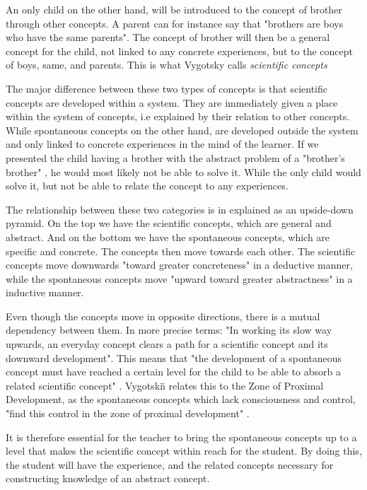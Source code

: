 An only child on the other hand, will be introduced to the concept of brother through other concepts. A parent can for instance say that "brothers are boys who have the same parents". The concept of brother will then be a general concept for the child, not linked to any concrete experiences, but to the concept of boys, same, and parents. This is what Vygotsky calls \emph{scientific concepts}

The major difference between these two types of concepts is that scientific concepts are developed within a system. They are immediately given a place within the system of concepts, i.e explained by their relation to other concepts. While spontaneous concepts on the other hand, are developed outside the system and only linked to concrete experiences in the mind of the learner. If we presented the child having a brother with the abstract problem of a "brother's brother" \citep{vygotsky2012thought}, he would most likely not be able to solve it. While the only child would solve it, but not be able to relate the concept to any experiences.  

The relationship between these two categories is in \citet{vygotsky2012thought} explained as an upside-down pyramid. On the top we have the scientific concepts, which are general and abstract. And on the bottom we have the spontaneous concepts, which are specific and concrete. The concepts then move towards each other. The scientific concepts move downwards "toward greater concreteness" in a deductive manner, while the spontaneous concepts move "upward toward greater abstractness" \citep{vygotsky2012thought} in a inductive manner.

Even though the concepts move in opposite directions, there is a mutual dependency between them. In more precise terms: "In working its slow way upwards, an everyday concept clears a path for a scientific concept and its downward development". This means that "the development of a spontaneous concept must have reached a certain level for the child to be able to absorb a related scientific concept" \citep{vygotsky2012thought}. Vygotski{\u\i} relates this to the Zone of Proximal Development, as the spontaneous concepts which lack consciousness and control, "find this control in the zone of proximal development" \citep{vygotsky2012thought}.

It is therefore essential for the teacher to bring the spontaneous concepts up to a level that makes the scientific concept within reach for the student. By doing this, the student will have the experience, and the related concepts necessary for constructing knowledge of an abstract concept.  

